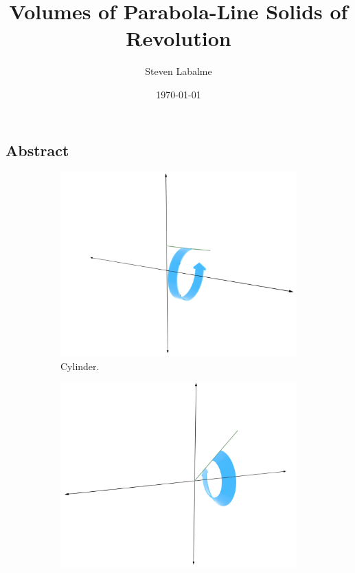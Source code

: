 \documentclass{article}
\title{Volumes of Parabola-Line Solids of Revolution}
\author{Steven Labalme}
\date{\today}
\begin{document}
\maketitle
{}
\newpage
\tableofcontents
\listoffigures
{}
\newpage

\pagestyle{fancy}
\fancyhf{}
\renewcommand{\headrulewidth}{0pt}
\setcounter{secnumdepth}{0}

\begin{center}
\section{Abstract}
\end{center}
\begin{figure}[h!]
  \centering
  \begin{subfigure}[b]{0.4\linewidth}
    \includegraphics[width=\linewidth]{Blender/ParabolaLineIntegration-AbstractCylinder-f_0001.png}
    \caption{Cylinder.}
    \label{fig:abstracta}
  \end{subfigure}
  \begin{subfigure}[b]{0.4\linewidth}
    \includegraphics[width=\linewidth]{Blender/ParabolaLineIntegration-AbstractCone-f_0001.png}

\end{subfigure}
\end{figure}
\end{document}

